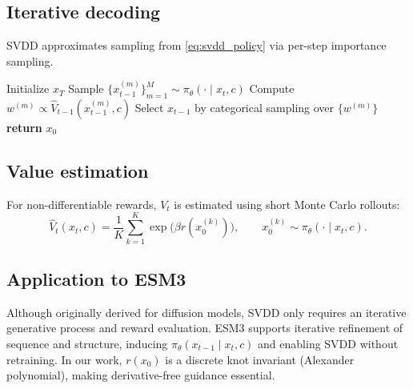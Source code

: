 \documentclass{article}
\begin{document}
\subsection{Iterative decoding}
SVDD approximates sampling from \eqref{eq:svdd_policy} via per-step importance sampling.

\begin{algorithm}[h]
\caption{SVDD-style derivative-free decoding}
\label{alg:svdd}
\begin{algorithmic}[1]
\STATE Initialize $x_T$
    \STATE Sample $\{x_{t-1}^{(m)}\}_{m=1}^M \sim \pi_\theta(\cdot\mid x_t,c)$
    \STATE Compute $w^{(m)} \propto \widehat V_{t-1}(x_{t-1}^{(m)},c)$
    \STATE Select $x_{t-1}$ by categorical sampling over $\{w^{(m)}\}$
\ENDFOR
\STATE \textbf{return} $x_0$
\end{algorithmic}
\end{algorithm}

\subsection{Value estimation}
For non-differentiable rewards, $V_t$ is estimated using short Monte Carlo rollouts:
\begin{equation}
\widehat V_t(x_t,c)
=
\frac{1}{K}\sum_{k=1}^K
\exp\!\big(\beta r(x_0^{(k)})\big),
\qquad
x_0^{(k)}\sim\pi_\theta(\cdot\mid x_t,c).
\end{equation}

\subsection{Application to ESM3}
Although originally derived for diffusion models, SVDD only requires an iterative generative process and reward evaluation.
ESM3 supports iterative refinement of sequence and structure, inducing $\pi_\theta(x_{t-1}\mid x_t,c)$ and enabling SVDD without retraining.
In our work, $r(x_0)$ is a discrete knot invariant (Alexander polynomial), making derivative-free guidance essential.
\end{document}

